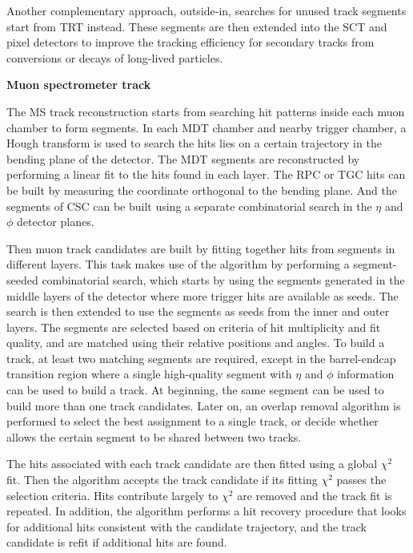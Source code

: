 Another complementary approach, outside-in, searches for unused track segments start from TRT instead.
These segments are then extended into the SCT and pixel detectors to improve the tracking efficiency for secondary tracks from conversions or decays of long-lived particles.

\textbf{Muon spectrometer track}

The MS track reconstruction\cite{Aad:2016jkr} starts from searching hit patterns inside each muon chamber to form segments.
In each MDT chamber and nearby trigger chamber, a Hough transform\cite{ILLINGWORTH198887} is used to search the hits lies on a certain trajectory in the bending plane of the detector.
The MDT segments are reconstructed by performing a linear fit to the hits found in each layer.
The RPC or TGC hits can be built by measuring the coordinate orthogonal to the bending plane.
And the segments of CSC can be built using a separate combinatorial search in the $\eta$ and $\phi$ detector planes.

Then muon track candidates are built by fitting together hits from segments in different layers.
This task makes use of the algorithm by performing a segment-seeded combinatorial search, which starts by using the segments generated in the middle layers of the detector where more trigger hits are available as seeds.
The search is then extended to use the segments as seeds from the inner and outer layers.
The segments are selected based on criteria of hit multiplicity and fit quality, and are matched using their relative positions and angles.
To build a track, at least two matching segments are required, except in the barrel-endcap transition region where a single high-quality segment with $\eta$ and $\phi$ information can be used to build a track.
At beginning, the same segment can be used to build more than one track candidates.
Later on, an overlap removal algorithm is performed to select the best assignment to a single track, or decide whether allows the certain segment to be shared between two tracks.

The hits associated with each track candidate are then fitted using a global $\chi^{2}$ fit.
Then the algorithm accepts the track candidate if its fitting $\chi^{2}$ passes the selection criteria.
Hits contribute largely to $\chi^{2}$ are removed and the track fit is repeated.
In addition, the algorithm performs a hit recovery procedure that looks for additional hits consistent with the candidate trajectory, and the track candidate is refit if additional hits are found.

